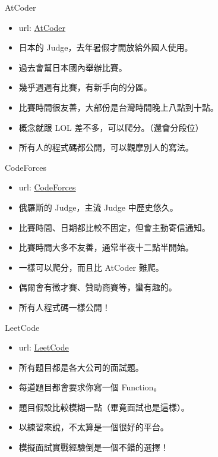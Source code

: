 \documentclass[t]{beamer}
\begin{document}
\begin{frame}{AtCoder}
  \begin{itemize}
    \item url: \href{https://atcoder.jp/}{\underline{AtCoder}}
    \item 日本的 Judge，去年暑假才開放給外國人使用。
    \item 過去會幫日本國內舉辦比賽。
    \item 幾乎週週有比賽，有新手向的分區。
    \item 比賽時間很友善，大部份是台灣時間晚上八點到十點。
    \item 概念就跟 LOL 差不多，可以爬分。（還會分段位）
    \item 所有人的程式碼都公開，可以觀摩別人的寫法。
  \end{itemize}
\end{frame}

\begin{frame}{CodeForces}
  \begin{itemize}
    \item url: \href{http://codeforces.com/}{\underline{CodeForces}}
    \item 俄羅斯的 Judge，主流 Judge 中歷史悠久。
    \item 比賽時間、日期都比較不固定，但會主動寄信通知。
    \item 比賽時間大多不友善，通常半夜十二點半開始。
    \item 一樣可以爬分，而且比 AtCoder 難爬。
    \item 偶爾會有徵才賽、贊助商賽等，蠻有趣的。
    \item 所有人程式碼一樣公開！
  \end{itemize}
\end{frame}

\begin{frame}{LeetCode}
  \begin{itemize}
    \item url: \href{https://leetcode.com/}{\underline{LeetCode}}
    \item 所有題目都是各大公司的面試題。
    \item 每道題目都會要求你寫一個 Function。
    \item 題目假設比較模糊一點（畢竟面試也是這樣）。
    \item 以練習來說，不太算是一個很好的平台。
    \item 模擬面試實戰經驗倒是一個不錯的選擇！
  \end{itemize}
\end{frame}
\end{document}
